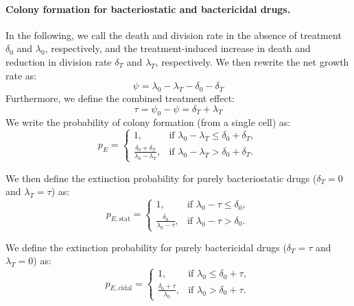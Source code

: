 \paragraph{Colony formation for bacteriostatic and bactericidal drugs.}
In the following, we call the death and division rate in the absence of treatment $\delta_0$ and $\lambda_0$, respectively, and the treatment-induced increase in death and reduction in division rate $\delta_T$ and $\lambda_T$, respectively.
We then rewrite the net growth rate as:
\begin{equation}
  \psi = \lambda_0 - \lambda_T - \delta_0 - \delta_T
\end{equation}
Furthermore, we define the combined treatment effect:
\begin{equation}
  \tau = \psi_0 - \psi = \delta_T + \lambda_T
\end{equation}
We write the probability of colony formation (from a single cell) as:
\begin{equation}
  p_E =
  \begin{cases}
    1, & \text{if } \lambda_0 - \lambda_T \leq \delta_0 + \delta_T, \\
    \frac{\delta_0 + \delta_T}{\lambda_0 - \lambda_T}, & \text{if } \lambda_0 - \lambda_T > \delta_0 + \delta_T.
  \end{cases}
\end{equation}

We then define the extinction probability for purely bacteriostatic drugs ($\delta_T = 0$ and $\lambda_T = \tau$) as:
\begin{equation}
  p_{E, \text{stat}} =
  \begin{cases}
    1, & \text{if } \lambda_0 - \tau \leq \delta_0, \\
    \frac{\delta_0}{\lambda_0 - \tau}, & \text{if } \lambda_0 - \tau > \delta_0.
  \end{cases}
\end{equation}

We define the extinction probability for purely bactericidal drugs ($\delta_T = \tau$ and $\lambda_T = 0$) as:
\begin{equation}
  p_{E, \text{cidal}} =
  \begin{cases}
    1, & \text{if } \lambda_0  \leq \delta_0 + \tau, \\
    \frac{\delta_0 + \tau}{\lambda_0}, & \text{if } \lambda_0  > \delta_0 + \tau.
  \end{cases}
  \label{eq:pE_cidal}
\end{equation}

